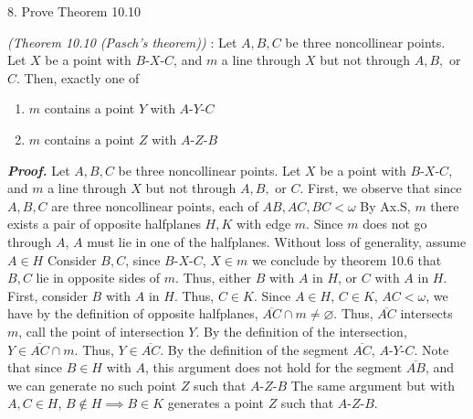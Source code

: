 \documentclass{report}
\begin{document}
    \bigbreak \noindent 
    \begin{mdframed}
        8. Prove Theorem 10.10        
    \end{mdframed}
    \bigbreak \noindent 
    \begin{remark}
        \textit{(Theorem 10.10 (Pasch's theorem))} :
        Let $A,B,C$ be three noncollinear points. Let $X$ be a point with $ B\text{-}X\text{-}C $, and $m$ a line through $X$ but not through $A,B,$ or $C$. Then, exactly one of
        \begin{enumerate}
            \item $m$ contains a point $Y$ with $ A\text{-}Y\text{-}C$
            \item $m$ contains a point $Z$ with $ A\text{-}Z\text{-}B $
        \end{enumerate}

    \end{remark}
    \bigbreak \noindent 
    \textbf{\textit{Proof.}} Let $A,B,C$ be three noncollinear points. Let $X$ be a point with $ B\text{-}X\text{-}C$, and $m$ a line through $X$ but not through $A,B,$ or $C$.
    \bigbreak \noindent 
    First, we observe that since $A,B,C$ are three noncollinear points, each of $AB,AC,BC < \omega$
    \bigbreak \noindent 
    By Ax.S, $m$ there exists a pair of opposite halfplanes $H,K$ with edge $m$. Since $m$ does not go through $A$, $A$ must lie in one of the halfplanes. Without loss of generality, assume $A \in H$
    \bigbreak \noindent 
    Consider $B,C$, since $ B\text{-}X\text{-}C$, $X\in m$ we conclude by theorem 10.6 that $B,C$ lie in opposite sides of $m$. Thus, either $B$ with $A$ in $H$, or $C$ with $A$ in $H$. 
    \bigbreak \noindent 
    First, consider $B$ with $A$ in $H$. Thus, $C \in K$. Since $A \in H$, $C \in K$, $AC < \omega$, we have by the definition of opposite halfplanes, $\overline{AC} \cap m \ne \varnothing$. Thus, $ \overline{AC}$ intersects $m$, call the point of intersection $Y$. By the definition of the intersection, $Y \in \overline{AC} \cap m$. Thus, $Y \in \overline{AC}$. By the definition of the segment $\overline{AC}$, $ A\text{-}Y\text{-}C$.  
    \bigbreak \noindent 
    Note that since $B \in H$ with $A$, this argument does not hold for the segment $\overline{AB}$, and we can generate no such point $Z$ such that $ A\text{-}Z\text{-}B$
    \bigbreak \noindent 
    The same argument but with $A,C \in H$, $B \not\in H \implies B \in K$ generates a point $Z$ such that $ A\text{-}Z\text{-}B$.  \endpf
    
\end{document}
